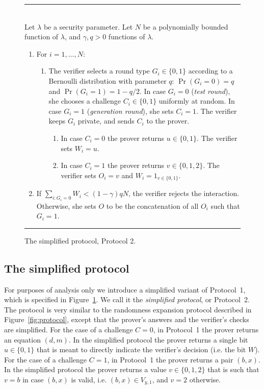 \documentclass[11pt]{article}
\theoremstyle{remark}
\theoremstyle{definition}
\begin{document}
\begin{figure}[htbp]
\rule[1ex]{16.5cm}{0.5pt}\\
Let $\lambda$ be a security parameter. Let $N$ be a polynomially bounded function of $\lambda$, and $\gamma,q>0$ functions of $\lambda$. 
\begin{enumerate}
\item For $i=1,\ldots,N$:
\begin{enumerate}
\item The verifier selects a round type $G_i \in \{0,1\}$ according to a Bernoulli  distribution with parameter $q$: $\Pr(G_i=0)=q$ and $\Pr(G_i=1)=1-q/2$. In case $G_i=0$ (\emph{test round}), she chooses a challenge $C_i\in \{0,1\}$ uniformly at random. In case $G_i=1$ (\emph{generation round}), she sets $C_i=1$. The verifier keeps $G_i$ private, and sends $C_i$ to the prover. 
\begin{enumerate}
\item In case $C_i=0$ the prover returns $u\in\{0,1\}$. The verifier sets $W_i = u$.  
\item In case $C_i=1$ the prover returns $v\in\{0,1,2\}$. The verifier sets $O_i=v$ and $W_i = 1_{v\in\{0,1\}}$.   
\end{enumerate}
\end{enumerate}
\item If $\sum_{i: G_i=0} W_i < (1-\gamma)qN$, the verifier rejects the interaction. Otherwise, she sets $O$ to be the concatenation of all $O_i$ such that $G_i=1$.
\end{enumerate}
\rule[1ex]{16.5cm}{0.5pt}
\caption{The simplified protocol, Protocol 2.}
\label{fig:protocol2}
\end{figure}


\subsection{The simplified protocol}
\label{sec:si-protocol}

For purposes of analysis only we introduce a simplified variant of Protocol~1, which is specified in Figure~\ref{fig:protocol2}. We call it the \emph{simplified protocol}, or Protocol~2. The protocol is very similar to the randomness expansion protocol described in Figure~\ref{fig:protocol}, except that the prover's answers and the verifier's checks are simplified. For the case of a challenge $C=0$, in Protocol~1 the prover returns an equation $(d,m)$. In the simplified protocol the prover returns a single bit $u\in\{0,1\}$ that is meant to directly indicate the verifier's decision (i.e. the bit $W$). For the case of a challenge $C=1$, in Protocol~1 the prover returns a pair $(b,x)$. In the simplified protocol the prover returns a value $v\in\{0,1,2\}$ that is such that $v=b$ in case $(b,x)$ is valid, i.e. $(b,x)\in V_{y,1}$, and $v=2$ otherwise. 
\end{document}
